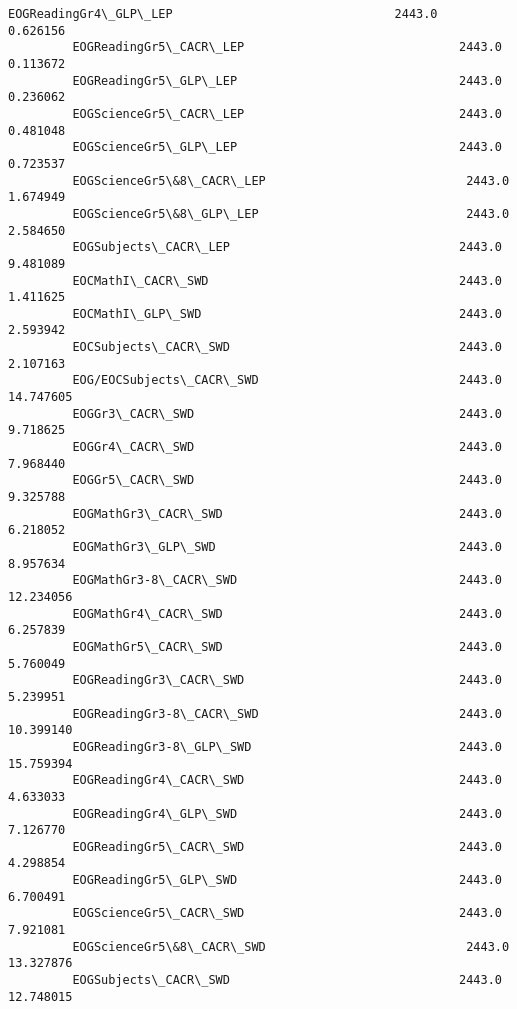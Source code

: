 \documentclass[11pt]{article}
\begin{document}
\begin{Verbatim}[commandchars=\\\{\}]
         EOGReadingGr4\_GLP\_LEP                               2443.0       0.626156   
         EOGReadingGr5\_CACR\_LEP                              2443.0       0.113672   
         EOGReadingGr5\_GLP\_LEP                               2443.0       0.236062   
         EOGScienceGr5\_CACR\_LEP                              2443.0       0.481048   
         EOGScienceGr5\_GLP\_LEP                               2443.0       0.723537   
         EOGScienceGr5\&8\_CACR\_LEP                            2443.0       1.674949   
         EOGScienceGr5\&8\_GLP\_LEP                             2443.0       2.584650   
         EOGSubjects\_CACR\_LEP                                2443.0       9.481089   
         EOCMathI\_CACR\_SWD                                   2443.0       1.411625   
         EOCMathI\_GLP\_SWD                                    2443.0       2.593942   
         EOCSubjects\_CACR\_SWD                                2443.0       2.107163   
         EOG/EOCSubjects\_CACR\_SWD                            2443.0      14.747605   
         EOGGr3\_CACR\_SWD                                     2443.0       9.718625   
         EOGGr4\_CACR\_SWD                                     2443.0       7.968440   
         EOGGr5\_CACR\_SWD                                     2443.0       9.325788   
         EOGMathGr3\_CACR\_SWD                                 2443.0       6.218052   
         EOGMathGr3\_GLP\_SWD                                  2443.0       8.957634   
         EOGMathGr3-8\_CACR\_SWD                               2443.0      12.234056   
         EOGMathGr4\_CACR\_SWD                                 2443.0       6.257839   
         EOGMathGr5\_CACR\_SWD                                 2443.0       5.760049   
         EOGReadingGr3\_CACR\_SWD                              2443.0       5.239951   
         EOGReadingGr3-8\_CACR\_SWD                            2443.0      10.399140   
         EOGReadingGr3-8\_GLP\_SWD                             2443.0      15.759394   
         EOGReadingGr4\_CACR\_SWD                              2443.0       4.633033   
         EOGReadingGr4\_GLP\_SWD                               2443.0       7.126770   
         EOGReadingGr5\_CACR\_SWD                              2443.0       4.298854   
         EOGReadingGr5\_GLP\_SWD                               2443.0       6.700491   
         EOGScienceGr5\_CACR\_SWD                              2443.0       7.921081   
         EOGScienceGr5\&8\_CACR\_SWD                            2443.0      13.327876   
         EOGSubjects\_CACR\_SWD                                2443.0      12.748015   

\end{Verbatim}
\end{document}
